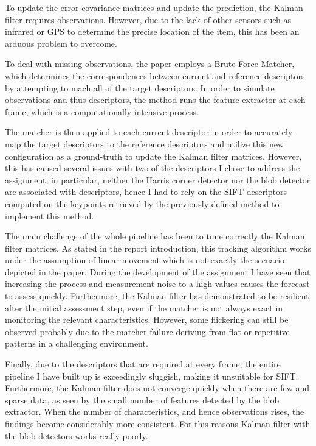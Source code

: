 \documentclass[journal]{IEEEtran}
\begin{document}
To update the error covariance matrices and update the prediction, the Kalman filter requires observations.
However, due to the lack of other sensors such as infrared or GPS to determine the precise location of the item, this has been an arduous problem to overcome.

To deal with missing observations, the paper employs a Brute Force Matcher, which determines the correspondences between current and reference descriptors by attempting to mach all of the target descriptors. In order to simulate observations and thus descriptors, the method runs the feature extractor at each frame, which is a computationally intensive process. 

The matcher is then applied to each current descriptor in order to accurately map the target descriptors to the reference descriptors and utilize this new configuration as a ground-truth to update the Kalman filter matrices.
However, this has caused several issues with two of the descriptors I chose to address the assignment; in particular, neither the Harris corner detector nor the blob detector are associated with descriptors, hence I had to rely on the SIFT descriptors computed on the keypoints retrieved by the previously defined method to implement this method. 

The main challenge of the whole pipeline has been to tune correctly the Kalman filter matrices. As stated in the report introduction, this tracking algorithm works under the assumption of linear movement which is not exactly the scenario depicted in the paper. During the development of the assignment I have seen that increasing the process and measurement noise to a high values causes the forecast to assess quickly.
Furthermore, the Kalman filter has demonstrated to be resilient after the initial assessment step, even if the matcher is not always exact in monitoring the relevant characteristics. However, some flickering can still be observed probably due to the matcher failure deriving from flat or repetitive patterns in a challenging environment.

Finally, due to the descriptors that are required at every frame, the entire pipeline I have built up is exceedingly sluggish, making it unsuitable for SIFT. Furthermore, the Kalman filter does not converge quickly when there are few and sparse data, as seen by the small number of features detected by the blob extractor. When the number of characteristics, and hence observations rises, the findings become considerably more consistent. For this reasons Kalman filter with the blob detectors works really poorly.
\end{document}
